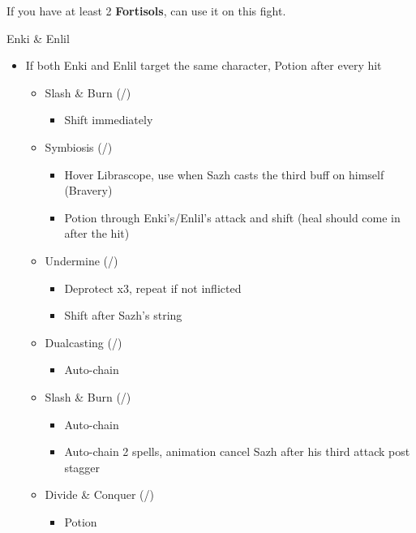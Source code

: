 If you have at least 2 \textbf{Fortisols}, can use it on this fight.
\vfill
\ 

\renewcommand{\first}{[1] Slash \& Burn (\rav/\com)}
\renewcommand{\second}{[2] Symbiosis (\med/\syn)}
\renewcommand{\third}{[3] Tide Turner (\sab/\syn)}
\renewcommand{\fourth}{[4] Dualcasting (\rav/\rav)}
\renewcommand{\fifth}{[5] Undermine (\sab/\rav)}
\renewcommand{\sixth}{[6] Divide \& Conquer (\sab/\com)}
\begin{battle}[1:39]{Enki \& Enlil}
		\begin{itemize}
			\item If both Enki and Enlil target the same character, Potion after every hit
			      \begin{itemize}
			\item \first
			      \begin{itemize}
				      \item Shift immediately
			      \end{itemize}
			\item \second
			      \begin{itemize}
				      \item Hover Librascope, use when Sazh casts the third buff on himself (Bravery)
				      \item Potion through Enki's/Enlil's attack and shift (heal should come in after the hit)
			      \end{itemize}
			\item \fifth
			      \begin{itemize}
				      \item Deprotect x3, repeat if not inflicted
				      \item Shift after Sazh's string
			      \end{itemize}
			\item \fourth
			      \begin{itemize}
				      \item Auto-chain
			      \end{itemize}
			\item \first
			      \begin{itemize}
				      \item Auto-chain
				      \item Auto-chain 2 spells, animation cancel Sazh after his third attack post stagger
			      \end{itemize}
			\item \sixth
			      \begin{itemize}
				      \item Potion

\end{itemize}
\end{itemize}
\end{itemize}
\end{battle}
